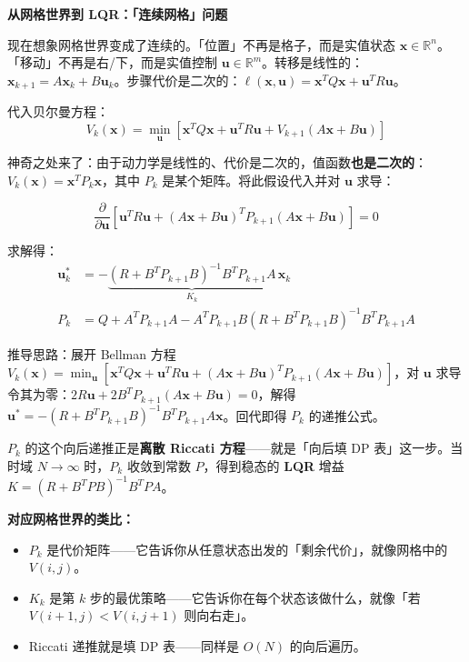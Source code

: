 \vspace{0.5em}
\begin{mdframed}[linewidth=1pt, innertopmargin=10pt, innerbottommargin=10pt]
\textbf{从网格世界到 LQR：「连续网格」问题}

\vspace{0.3em}
现在想象网格世界变成了连续的。「位置」不再是格子，而是实值状态 $\mathbf{x} \in \mathbb{R}^n$。「移动」不再是右/下，而是实值控制 $\mathbf{u} \in \mathbb{R}^m$。转移是线性的：$\mathbf{x}_{k+1} = A\mathbf{x}_k + B\mathbf{u}_k$。步骤代价是二次的：$\ell(\mathbf{x}, \mathbf{u}) = \mathbf{x}^T Q \mathbf{x} + \mathbf{u}^T R \mathbf{u}$。

代入贝尔曼方程：
\[
V_k(\mathbf{x}) = \min_{\mathbf{u}} \left[ \mathbf{x}^T Q \mathbf{x} + \mathbf{u}^T R \mathbf{u} + V_{k+1}(A\mathbf{x} + B\mathbf{u}) \right]
\]

神奇之处来了：由于动力学是线性的、代价是二次的，值函数\textbf{也是二次的}：$V_k(\mathbf{x}) = \mathbf{x}^T P_k \mathbf{x}$，其中 $P_k$ 是某个矩阵。将此假设代入并对 $\mathbf{u}$ 求导：

\[
\frac{\partial}{\partial \mathbf{u}} \left[ \mathbf{u}^T R \mathbf{u} + (A\mathbf{x} + B\mathbf{u})^T P_{k+1} (A\mathbf{x} + B\mathbf{u}) \right] = 0
\]

求解得：
\begin{align}
\mathbf{u}_k^* &= -\underbrace{(R + B^T P_{k+1} B)^{-1} B^T P_{k+1} A}_{K_k} \, \mathbf{x}_k \\
P_k &= Q + A^T P_{k+1} A - A^T P_{k+1} B (R + B^T P_{k+1} B)^{-1} B^T P_{k+1} A
\end{align}

推导思路：展开 Bellman 方程 $V_k(\mathbf{x}) = \min_{\mathbf{u}}[\mathbf{x}^T Q \mathbf{x} + \mathbf{u}^T R \mathbf{u} + (A\mathbf{x}+B\mathbf{u})^T P_{k+1}(A\mathbf{x}+B\mathbf{u})]$，对 $\mathbf{u}$ 求导令其为零：$2R\mathbf{u} + 2B^T P_{k+1}(A\mathbf{x} + B\mathbf{u}) = 0$，解得 $\mathbf{u}^* = -(R + B^T P_{k+1} B)^{-1} B^T P_{k+1} A \mathbf{x}$。回代即得 $P_k$ 的递推公式。

$P_k$ 的这个向后递推正是\textbf{离散 Riccati 方程}——就是「向后填 DP 表」这一步。当时域 $N \to \infty$ 时，$P_k$ 收敛到常数 $P$，得到稳态的 \textbf{LQR} 增益 $K = (R + B^T P B)^{-1} B^T P A$。

\textbf{对应网格世界的类比：}
\begin{itemize}[nosep]
    \item $P_k$ 是代价矩阵——它告诉你从任意状态出发的「剩余代价」，就像网格中的 $V(i,j)$。
    \item $K_k$ 是第 $k$ 步的最优策略——它告诉你在每个状态该做什么，就像「若 $V(i+1,j) < V(i,j+1)$ 则向右走」。
    \item Riccati 递推就是填 DP 表——同样是 $O(N)$ 的向后遍历。
\end{itemize}
\end{mdframed}

